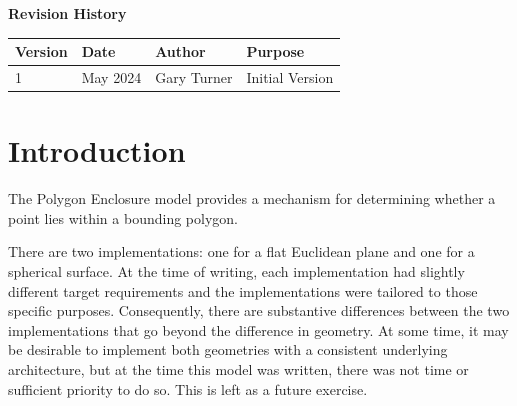 \documentclass[11pt,fleqn]{report}
\begin{document}
\pagestyle{empty}
\titlePage
{}
\tableofcontents %
\vfill
{\Large \textbf {Revision History}}
{\large
\begin{center}
\begin{tabular}{|l||l|l|l|}
\hline
 \textbf{Version} & \textbf{Date} & \textbf{Author} & \textbf{Purpose} \\
\hline \hline
1 & May 2024 & Gary Turner & Initial Version \\ \hline
\end{tabular}
\end{center}
}


\chapter{Introduction} %
\pagestyle{plain}
The Polygon Enclosure model provides a mechanism for determining whether a point
lies within a bounding polygon.

There are two implementations: one for a flat Euclidean plane and one for a
spherical surface. At the time of writing, each implementation had slightly
different target requirements and the implementations were tailored to those
specific purposes. Consequently, there are substantive differences between the
two implementations that go beyond the difference in geometry.
At some time, it may be desirable to implement both geometries with a consistent
underlying architecture, but at the time this model was written, there was not
time or sufficient priority to do so. This is left as a future exercise.
\end{document}
